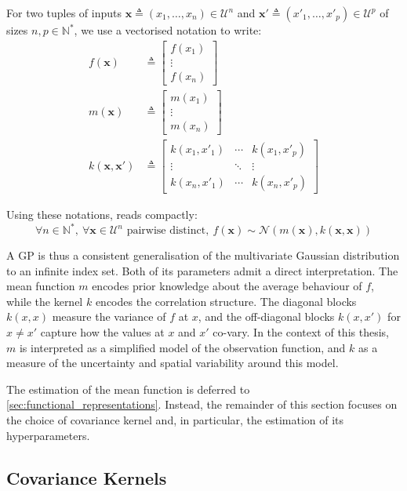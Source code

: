 For two tuples of inputs $\mathbf{x}\triangleq(x_1,\dots,x_n)\in\mathcal{U}^n$ and $\mathbf{x}'\triangleq(x'_1,\dots,x'_p)\in\mathcal{U}^p$ of sizes $n,p\in\mathbb{N}^*$, we use a vectorised notation to write:
\begin{align}
	f(\mathbf{x})&\triangleq\begin{bmatrix}
	f(x_1)\\\vdots\\f(x_n)
	\end{bmatrix}\\
	m(\mathbf{x})&\triangleq\begin{bmatrix}
	m(x_1)\\\vdots\\m(x_n)
	\end{bmatrix}\\
	k(\mathbf{x},\mathbf{x}')&\triangleq\begin{bmatrix}
	k(x_1,x'_1)&\cdots&k(x_1,x'_p)\\\vdots&\ddots&\vdots\\k(x_n,x'_1)&\cdots&k(x_n,x'_p)
	\end{bmatrix}
\end{align}

Using these notations,  reads compactly:
\begin{equation}
	\forall n\in\mathbb{N}^*,\:\forall\mathbf{x}\in\mathcal{U}^n\text{ pairwise distinct},\:f(\mathbf{x})\sim\mathcal{N}\left(m(\mathbf{x}),k(\mathbf{x},\mathbf{x})\right)
\end{equation}

A GP is thus a consistent generalisation of the multivariate Gaussian distribution to an infinite index set. Both of its parameters admit a direct interpretation. The mean function $m$ encodes prior knowledge about the average behaviour of $f$, while the kernel $k$ encodes the correlation structure. The diagonal blocks $k(x,x)$ measure the variance of $f$ at $x$, and the off-diagonal blocks $k(x,x')$ for $x\neq x'$ capture how the values at $x$ and $x'$ co-vary. In the context of this thesis, $m$ is interpreted as a simplified model of the observation function, and $k$ as a measure of the uncertainty and spatial variability around this model.

The estimation of the mean function is deferred to \cref{sec:functional_representations}. Instead, the remainder of this section focuses on the choice of covariance kernel and, in particular, the estimation of its hyperparameters.

\subsection{Covariance Kernels}

